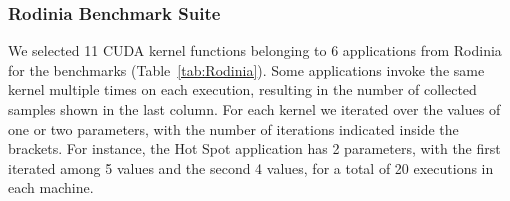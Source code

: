 \subsubsection{Rodinia Benchmark Suite}
We selected 11 CUDA kernel functions belonging to 6 applications from Rodinia for the benchmarks (Table~\ref{tab:Rodinia}). Some applications invoke the same kernel multiple times on each execution, resulting in the number of collected samples shown in the last column. For each kernel we iterated over the values of one or two parameters, with the number of iterations indicated inside the brackets. For instance, the Hot Spot application has 2 parameters, with the first iterated among 5 values and the second 4 values, for a total of 20 executions in each machine. %

